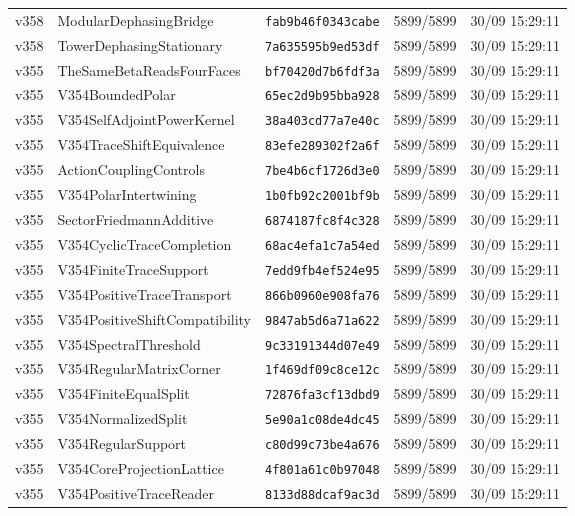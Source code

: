 \documentclass[11pt]{article}
\theoremstyle{definition}\newtheorem{deriv}{Derivação}
\begin{document}
{\begin{longtable}{@{}lllll@{}}
v358 & ModularDephasingBridge & \texttt{fab9b46f0343cabe} & 5899/5899 & 30/09 15:29:11 \\
v358 & TowerDephasingStationary & \texttt{7a635595b9ed53df} & 5899/5899 & 30/09 15:29:11 \\
v355 & TheSameBetaReadsFourFaces & \texttt{bf70420d7b6fdf3a} & 5899/5899 & 30/09 15:29:11 \\
v355 & V354BoundedPolar & \texttt{65ec2d9b95bba928} & 5899/5899 & 30/09 15:29:11 \\
v355 & V354SelfAdjointPowerKernel & \texttt{38a403cd77a7e40c} & 5899/5899 & 30/09 15:29:11 \\
v355 & V354TraceShiftEquivalence & \texttt{83efe289302f2a6f} & 5899/5899 & 30/09 15:29:11 \\
v355 & ActionCouplingControls & \texttt{7be4b6cf1726d3e0} & 5899/5899 & 30/09 15:29:11 \\
v355 & V354PolarIntertwining & \texttt{1b0fb92c2001bf9b} & 5899/5899 & 30/09 15:29:11 \\
v355 & SectorFriedmannAdditive & \texttt{6874187fc8f4c328} & 5899/5899 & 30/09 15:29:11 \\
v355 & V354CyclicTraceCompletion & \texttt{68ac4efa1c7a54ed} & 5899/5899 & 30/09 15:29:11 \\
v355 & V354FiniteTraceSupport & \texttt{7edd9fb4ef524e95} & 5899/5899 & 30/09 15:29:11 \\
v355 & V354PositiveTraceTransport & \texttt{866b0960e908fa76} & 5899/5899 & 30/09 15:29:11 \\
v355 & V354PositiveShiftCompatibility & \texttt{9847ab5d6a71a622} & 5899/5899 & 30/09 15:29:11 \\
v355 & V354SpectralThreshold & \texttt{9c33191344d07e49} & 5899/5899 & 30/09 15:29:11 \\
v355 & V354RegularMatrixCorner & \texttt{1f469df09c8ce12c} & 5899/5899 & 30/09 15:29:11 \\
v355 & V354FiniteEqualSplit & \texttt{72876fa3cf13dbd9} & 5899/5899 & 30/09 15:29:11 \\
v355 & V354NormalizedSplit & \texttt{5e90a1c08de4dc45} & 5899/5899 & 30/09 15:29:11 \\
v355 & V354RegularSupport & \texttt{c80d99c73be4a676} & 5899/5899 & 30/09 15:29:11 \\
v355 & V354CoreProjectionLattice & \texttt{4f801a61c0b97048} & 5899/5899 & 30/09 15:29:11 \\
v355 & V354PositiveTraceReader & \texttt{8133d88dcaf9ac3d} & 5899/5899 & 30/09 15:29:11 \\

\end{longtable}}
\end{document}
